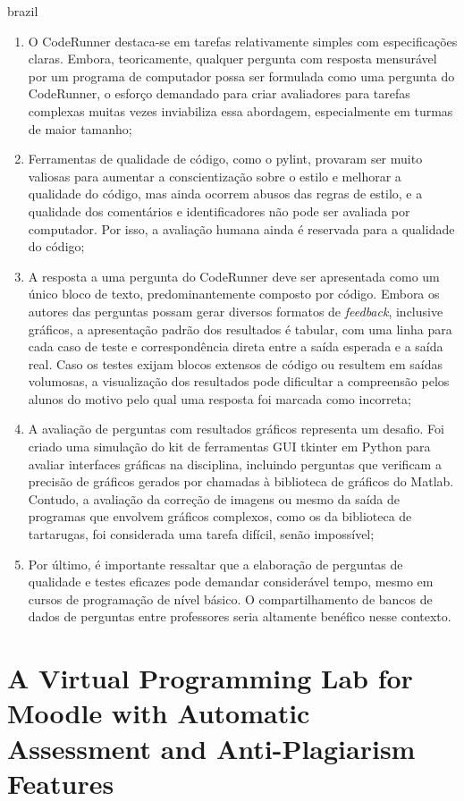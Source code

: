 \begin{otherlanguage*}{brazil}
\begin{enumerate} [label=(\alph*)]
    \item O CodeRunner destaca-se em tarefas relativamente simples com especificações claras. Embora, teoricamente, qualquer pergunta com resposta mensurável por um programa de computador possa ser formulada como uma pergunta do CodeRunner, o esforço demandado para criar avaliadores para tarefas complexas muitas vezes inviabiliza essa abordagem, especialmente em turmas de maior tamanho;
    \item Ferramentas de qualidade de código, como o pylint, provaram ser muito valiosas para aumentar a conscientização sobre o estilo e melhorar a qualidade do código, mas ainda ocorrem abusos das regras de estilo, e a qualidade dos comentários e identificadores não pode ser avaliada por computador. Por isso, a avaliação humana ainda é reservada para a qualidade do código;
    \item A resposta a uma pergunta do CodeRunner deve ser apresentada como um único bloco de texto, predominantemente composto por código. Embora os autores das perguntas possam gerar diversos formatos de \textit{feedback}, inclusive gráficos, a apresentação padrão dos resultados é tabular, com uma linha para cada caso de teste e correspondência direta entre a saída esperada e a saída real. Caso os testes exijam blocos extensos de código ou resultem em saídas volumosas, a visualização dos resultados pode dificultar a compreensão pelos alunos do motivo pelo qual uma resposta foi marcada como incorreta;
    \item A avaliação de perguntas com resultados gráficos representa um desafio. Foi criado uma simulação do kit de ferramentas GUI tkinter em Python para avaliar interfaces gráficas na disciplina, incluindo perguntas que verificam a precisão de gráficos gerados por chamadas à biblioteca de gráficos do Matlab. Contudo, a avaliação da correção de imagens ou mesmo da saída de programas que envolvem gráficos complexos, como os da biblioteca de tartarugas, foi considerada uma tarefa difícil, senão impossível;
    \item Por último, é importante ressaltar que a elaboração de perguntas de qualidade e testes eficazes pode demandar considerável tempo, mesmo em cursos de programação de nível básico. O compartilhamento de bancos de dados de perguntas entre professores seria altamente benéfico nesse contexto.
\end{enumerate}


\section{A Virtual Programming Lab for Moodle with Automatic Assessment and Anti-Plagiarism Features}


\end{otherlanguage*}
